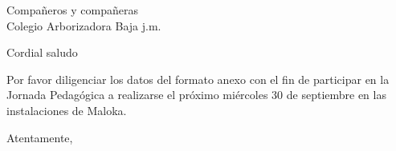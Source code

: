 \documentclass[letterpaper,spanish]{letter}
\begin{document}
\begin{letter}{Compañeros y compañeras\\Colegio Arborizadora Baja j.m.}
	
\opening{Cordial saludo}
Por favor diligenciar los datos del formato anexo con el fin de participar en la Jornada Pedagógica a realizarse el próximo miércoles 30 de septiembre en las instalaciones de Maloka.
\closing{Atentamente,}


\end{letter}
\end{document}
